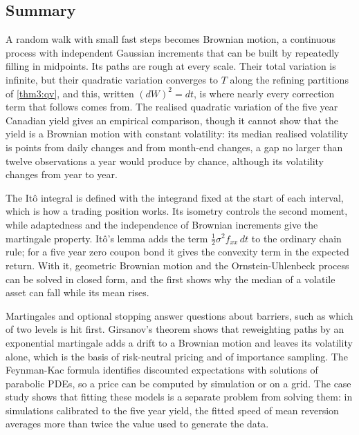 \begin{chapterrefs}
\FloatBarrier
\section{Summary}
\label{sec3:summary}

A random walk with small fast steps becomes Brownian motion, a continuous process with independent
Gaussian increments that can be built by repeatedly filling in midpoints. Its paths are rough at every
scale. Their total variation is infinite, but their quadratic variation converges to $T$ along the
refining partitions of \cref{thm3:qv}, and this, written $(dW)^2=dt$, is where nearly every correction term
that follows comes from. The realised quadratic variation of the five year Canadian yield gives an empirical
comparison, though it cannot show that the yield is a Brownian motion with constant volatility: its median realised volatility is \canRvDailyMed{} points from daily changes and \canRvMonthlyMed{} from
month-end changes, a gap no larger than twelve observations a year would produce by chance, although
its volatility changes from year to year.

The It\^o integral is defined with the integrand fixed at the start of each interval, which is how a
trading position works. Its isometry controls the second moment, while adaptedness and the
independence of Brownian increments give the martingale property. It\^o's lemma adds the term $\tfrac12\sigma^2f_{xx}\,dt$ to the ordinary chain rule; for a five year
zero coupon bond it gives the convexity term in the expected return. With it,
geometric Brownian motion and the Ornstein-Uhlenbeck process can be solved in closed form, and the
first shows why the median of a volatile asset can fall while its mean rises.

Martingales and optional stopping answer questions about barriers, such as which of two levels is hit
first. Girsanov's theorem shows that reweighting paths by an exponential martingale adds a drift to a
Brownian motion and leaves its volatility alone, which is the basis of risk-neutral pricing and of importance sampling. The Feynman-Kac
formula identifies discounted expectations with solutions of parabolic PDEs, so a price can be
computed by simulation or on a grid. The case study shows that fitting these models is a
separate problem from solving them: in simulations calibrated to the five year yield, the fitted speed
of mean reversion averages more than twice the value used to generate the data.


\end{chapterrefs}
